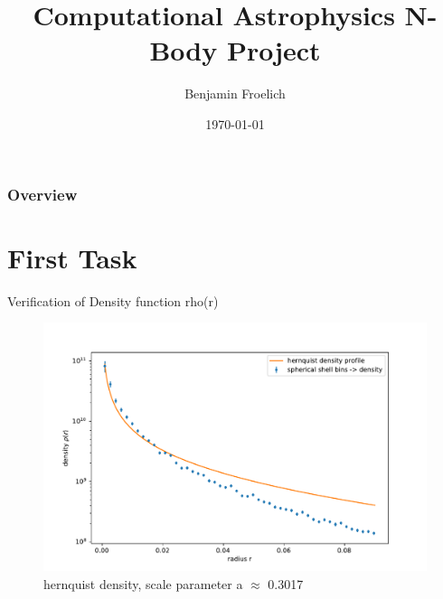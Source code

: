 \documentclass{beamer}
\title[Short title]{Computational Astrophysics N-Body Project} %
\author{Benjamin Froelich} %
\institute[UZH] %
{
University of Zuerich \\ %
\medskip
}
\date{\today} %
\begin{document}
\begin{frame}
\titlepage %
\end{frame}

\begin{frame}
\frametitle{Overview} %
\tableofcontents %
\end{frame}



\section{First Task}
\begin{frame}{Verification of Density function rho(r)}

\begin{figure}
	\centering
	\includegraphics[width=0.8\linewidth]{hernquist1}
	\caption{hernquist density, scale parameter a $\approx$ 0.3017}
	\label{fig:hernquist1}
\end{figure}

\end{frame}
\end{document}

